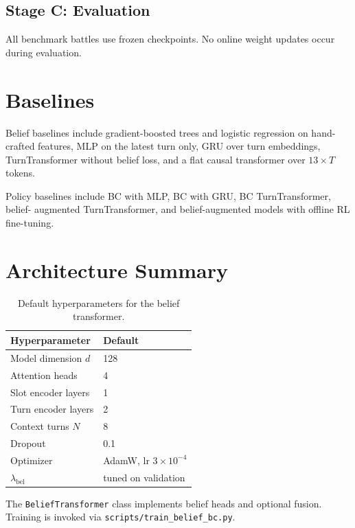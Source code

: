 \subsection{Stage C: Evaluation}

All benchmark battles use frozen checkpoints. No online weight updates occur
during evaluation.

\section{Baselines}

Belief baselines include gradient-boosted trees and logistic regression on
hand-crafted features, MLP on the latest turn only, GRU over turn embeddings,
TurnTransformer without belief loss, and a flat causal transformer over
$13 \times T$ tokens.

Policy baselines include BC with MLP, BC with GRU, BC TurnTransformer, belief-
augmented TurnTransformer, and belief-augmented models with offline RL
fine-tuning.

\section{Architecture Summary}

\begin{table}[ht]
  \centering
  \caption{Default hyperparameters for the belief transformer.}
  \label{tab:hyperparams}
  \begin{tabular}{ll}
    \toprule
    Hyperparameter & Default \\
    \midrule
    Model dimension $d$ & 128 \\
    Attention heads & 4 \\
    Slot encoder layers & 1 \\
    Turn encoder layers & 2 \\
    Context turns $N$ & 8 \\
    Dropout & 0.1 \\
    Optimizer & AdamW, lr $3\times10^{-4}$ \\
    $\lambda_\mathrm{bel}$ & tuned on validation \\
    \bottomrule
  \end{tabular}
\end{table}

The \texttt{BeliefTransformer} class implements belief heads and optional fusion.
Training is invoked via \texttt{scripts/train\_belief\_bc.py}.
